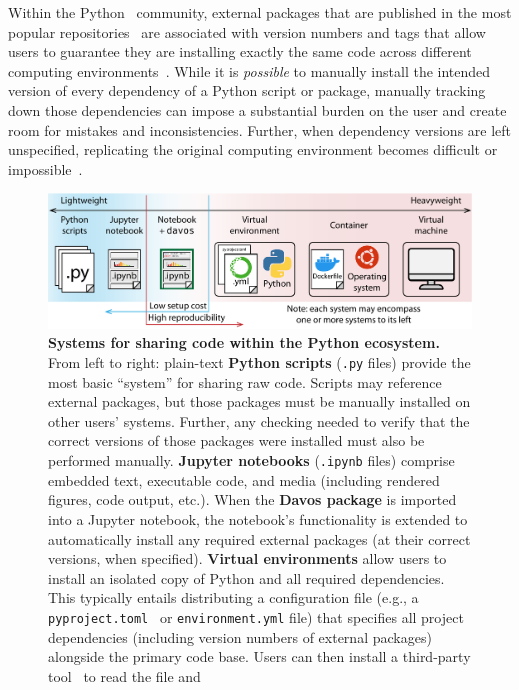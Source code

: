 \documentclass[preprint,12pt,a4paper]{elsarticle}
\begin{document}
Within the Python~\cite{vanR95} community, external packages that are
published in the most popular repositories~\cite{Pyth03, cond15} are
associated with version numbers and tags that allow users to guarantee
they are installing exactly the same code across different computing
environments~\cite{CoghStuf13}.  While it is \textit{possible} to
manually install the intended version of every dependency of a Python
script or package, manually tracking down those dependencies can
impose a substantial burden on the user and create room for mistakes
and inconsistencies. Further, when dependency versions are left
unspecified, replicating the original computing environment becomes
difficult or impossible~\citep{PimeEtal19}.

\begin{figure}[tp]
\centering
\includegraphics[width=\textwidth]{figs/shareable_code}
\caption{\small \textbf{Systems for sharing code within the Python
  ecosystem.}  From left to right: plain-text \textbf{Python
  scripts} (\texttt{.py} files) provide the most basic ``system''
  for sharing raw code.  Scripts may reference external packages, but
  those packages must be manually installed on other users' systems.
  Further, any checking needed to verify that the correct versions of
  those packages were installed must also be performed manually.
  \textbf{Jupyter notebooks} (\texttt{.ipynb} files) comprise embedded
  text, executable code, and media (including rendered figures, code
  output, etc.).  When the \textbf{Davos package} is imported
  into a Jupyter notebook, the notebook's functionality is extended to
  automatically install any required external packages (at their
  correct versions, when specified).  \textbf{Virtual environments}
  allow users to install an isolated copy of Python and all required
  dependencies. This typically entails distributing a configuration
  file (e.g., a \texttt{pyproject.toml}~\cite{CannEtal16} or
  \texttt{environment.yml} file) that specifies all project
  dependencies (including version numbers of external packages)
  alongside the primary code base. Users can then install a
  third-party tool~\cite[e.g.,][]{Anac12, Eust19} to read the file and
}
\end{figure}
\end{document}
